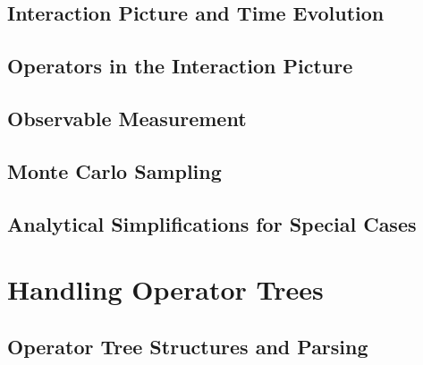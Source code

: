 \documentclass[
headings=optiontohead,              %
12pt,                               %
DIV=13,                             %
twoside=false,                      %
open=right,                         %
BCOR=00mm,                          %
toc=bibliographynumbered            %
]{scrreport}
\begin{document}
        \subsection{Interaction Picture and Time Evolution}
        \label{sec:theory-interaction-picture}
        
        \FloatBarrier
        
        \subsection{Operators in the Interaction Picture}
        \label{sec:theory-approximation-evaluation}
        
        \FloatBarrier

        \subsection{Observable Measurement}
        \label{sec:theory-observables}
        
        \FloatBarrier

        \subsection{Monte Carlo Sampling}
        \label{sec:theory-monte-carlo}
        
        \FloatBarrier

        \subsection{Analytical Simplifications for Special Cases}
        \label{sec:theory-special-cases}
        
        \FloatBarrier

    \section{Handling Operator Trees}
    \label{sec:theory-parsing-linting}
    
    \FloatBarrier

        \subsection{Operator Tree Structures and Parsing}
        \label{sec:theory-operator-trees}
        
        \FloatBarrier
\end{document}
